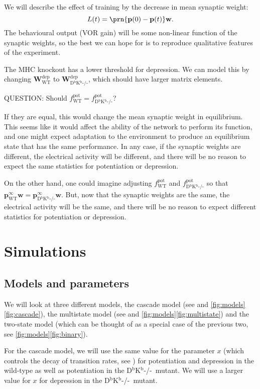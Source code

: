 \documentclass[12pt]{article}
\newcommand{\pr}{\mathbf{p}}
\newcommand{\eq}{\pr^\infty}
\newcommand{\w}{\mathbf{w}}
\newcommand{\W}{\mathbf{W}}
\newcommand{\pot}{^{\text{pot}}}
\newcommand{\dep}{^{\text{dep}}}
\newcommand{\wt}{_{\text{WT}}}
\newcommand{\kn}{_{\text{D$^\mathrm{b}$K$^\mathrm{b}$-/-}}}
\newcommand{\Kn}{D$^\mathrm{b}$K$^\mathrm{b}$-/-}
\begin{document}
We will describe the effect of training by the decrease in mean synaptic weight:
%
\begin{equation}\label{eq:learning}
  L(t) = \prn{\pr(0)-\pr(t)}\w.
\end{equation}
%
The behavioural output (VOR gain) will be some non-linear function of the synaptic weights, so the best we can hope for is to reproduce qualitative features of the experiment.

The MHC knockout has a lower threshold for depression.
We can model this by changing $\W\dep\wt$ to $\W\dep\kn$, which should have larger matrix elements.

QUESTION: Should $f\pot\wt=f\pot\kn$?

If they are equal, this would change the mean synaptic weight in equilibrium.
This seems like it would affect the ability of the network to perform its function, and one might expect adaptation to the environment to produce an equilibrium state that has the same performance.
In any case, if the synaptic weights are different, the electrical activity will be different, and there will be no reason to expect the same statistics for potentiation or depression.

On the other hand, one could imagine adjusting $f\pot\wt$ and $f\pot\kn$ so that $\eq\wt\w = \eq\kn\w$.
But, now that the synaptic weights are the same, the electrical activity will be the same, and there will be no reason to expect different statistics for potentiation or depression.


\section{Simulations}\label{sec:sims}

\subsection{Models and parameters}

We will look at three different models, the cascade model (see \cite{Fusi2005cascade} and \autoref{fig:models}\ref{fig:cascade}), the multistate model (see \cite{amit1994learning,Fusi2007multistate} and \autoref{fig:models}\ref{fig:multistate}) and the two-state model (which can be thought of as a special case of the previous two, see \autoref{fig:models}\ref{fig:binary}).

For the cascade model, we will use the same value for the parameter $x$ (which controls the decay of transition rates, see \cite{Fusi2005cascade}) for potentiation and depression in the wild-type as well as potentiation in the \Kn\ mutant. 
We will use a larger value for $x$ for depression in the \Kn\ mutant.
\end{document}
